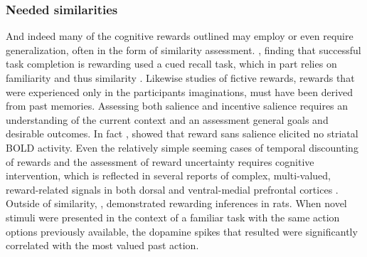 \documentclass[doc,12pt]{apa}        %
\begin{document}
\subsubsection{Needed similarities}
\label{sub:must_be_fuzzy}
And indeed many of the cognitive rewards outlined may employ or even require generalization, often in the form of similarity assessment.  , finding that successful task completion is rewarding used a cued recall task, which in part relies on familiarity \cite{Jacoby:1991p9096} and thus similarity \cite{Nosofsky:1988p9098}.  Likewise  studies of fictive rewards, rewards that were experienced only in the participants imaginations, must have been derived from past memories.  Assessing both salience and incentive salience requires an understanding of the current context and an assessment general goals and desirable outcomes.  In fact , showed that reward sans salience elicited no striatal BOLD activity.  Even the relatively simple seeming cases of temporal discounting of rewards and the assessment of reward uncertainty requires cognitive intervention, which is reflected in several reports of complex, multi-valued, reward-related signals in both dorsal and ventral-medial prefrontal cortices \cite{Tobler:2009p8302,Wallis:2010p8303,Kim:2009p8304,Seymour:2008p6518}.  Outside of similarity, , demonstrated rewarding inferences in rats. When novel stimuli were presented in the context of a familiar task with the same action options previously available, the dopamine spikes that resulted were significantly correlated with the most valued past action.
\end{document}
